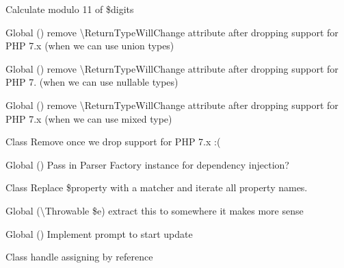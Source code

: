 \begin{DoxyRefList}
\label{todo__todo000004}%
%
Calculate modulo 11 of \$digits 
\item[Global \doxylink{class_psy_1_1_reflection_1_1_reflection_language_construct_afdeebfe3fcf5806fc79c074a6a3a6eb1}{Reflection\+Language\+Construct\+::get\+File\+Name} ()]\label{todo__todo000017}%
%
remove \textbackslash{}\+Return\+Type\+Will\+Change attribute after dropping support for PHP 7.\+x (when we can use union types) 
\item[Global \doxylink{class_psy_1_1_reflection_1_1_reflection_language_construct_parameter_a23ecbde357f7f6bde5a50f876334a74d}{Reflection\+Language\+Construct\+Parameter\+::get\+Class} ()]\label{todo__todo000018}%
%
remove \textbackslash{}\+Return\+Type\+Will\+Change attribute after dropping support for PHP 7. (when we can use nullable types)  
\item[Global \doxylink{class_psy_1_1_reflection_1_1_reflection_language_construct_parameter_af9b9401c63918169457fe8516324950f}{Reflection\+Language\+Construct\+Parameter\+::get\+Default\+Value} ()]\label{todo__todo000019}%
%
remove \textbackslash{}\+Return\+Type\+Will\+Change attribute after dropping support for PHP 7.\+x (when we can use mixed type) 
\item[Class \doxylink{class_psy_1_1_execution_loop_1_1_runkit_reloader}{Runkit\+Reloader} ]\label{todo__todo000013}%
%
Remove  once we drop support for PHP 7.\+x \+:(  
\item[Global \doxylink{class_psy_1_1_execution_loop_1_1_runkit_reloader_a095c5d389db211932136b53f25f39685}{Runkit\+Reloader\+::\+\_\+\+\_\+construct} ()]\label{todo__todo000014}%
%
Pass in Parser Factory instance for dependency injection?  
\item[Class \doxylink{class_hamcrest_1_1_core_1_1_set}{Set} ]\label{todo__todo000009}%
%
Replace \$property with a matcher and iterate all property names.  
\item[Global \doxylink{class_psy_1_1_shell_a25da25227ebf0a908cf1682c6df4ec1c}{Shell\+::format\+Exception} (\textbackslash{}Throwable \$e)]\label{todo__todo000020}%
%
extract this to somewhere it makes more sense 
\item[Global \doxylink{class_psy_1_1_shell_acf4d88742cef734b9a59b048e6e3d215}{Shell\+::write\+Version\+Info} ()]\label{todo__todo000021}%
%
Implement prompt to start update 
\item[Class \doxylink{class_psy_1_1_sudo_1_1_sudo_visitor}{Sudo\+Visitor} ]\label{todo__todo000022}%
%
handle assigning by reference 
\end{DoxyRefList}